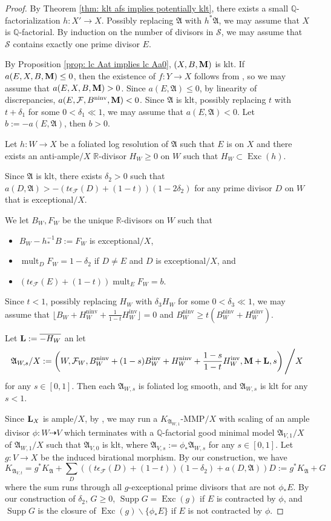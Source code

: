 \documentclass[12pt]{amsart}
\numberwithin{equation}{section}
\newcommand{\Mm}{{\bf{M}}}
\newcommand{\Rr}{\mathbb{R}}
\newcommand{\Exc}{\operatorname{Exc}}
\newcommand{\ninv}{\operatorname{ninv}}
\newcommand{\inv}{\operatorname{inv}}
\newcommand{\Supp}{\operatorname{Supp}}
\newcommand{\mult}{\operatorname{mult}}
\newcommand{\Aa}{{\mathfrak{A}}}
\newcommand{\Ff}{\mathcal{F}}
\newcommand{\Ll}{{\bf{L}}}
\theoremstyle{definition}
\theoremstyle{definition}
\theoremstyle{definition}
\begin{document}
\begin{proof}
By Theorem \ref{thm: klt afs implies potentially klt}, there exists a small $\mathbb Q$-factorialization $h: X'\rightarrow X$. Possibly replacing $\Aa$ with $h^*\Aa$, we may assume that $X$ is $\mathbb Q$-factorial. By induction on the number of divisors in $\mathcal{S}$, we may assume that $\mathcal{S}$ contains exactly one prime divisor $E$. 

By Proposition \ref{prop: lc Aat implies lc Aa0}, $(X,B,\Mm)$ is klt. If $a(E,X,B,\Mm)\leq 0$, then the existence of $f: Y\rightarrow X$ follows from \cite[Lemma 4.6]{BZ16}, so we may assume that $a(E,X,B,\Mm)>0$. Since $a(E,\Aa)\leq 0$, by linearity of discrepancies, $a(E,\Ff,B^{\ninv},\Mm)<0$. Since $\Aa$ is klt, possibly replacing $t$ with $t+\delta_1$ for some $0<\delta_1\ll 1$, we may assume that $a(E,\Aa)<0$. Let $b:=-a(E,\Aa)$, then $b>0$.

Let $h: W\rightarrow X$ be a foliated log resolution of $\Aa$ such that $E$ is on $X$ and there exists an anti-ample$/X$ $\Rr$-divisor $H_W\geq 0$ on $W$ such that $H_W\subset\Exc(h)$.

Since $\Aa$ is klt, there exists $\delta_2>0$ such that $a(D,\Aa)>-(t\epsilon_{\Ff}(D)+(1-t))(1-2\delta_2)$
for any prime divisor $D$ on $W$ that is exceptional$/X$.

We let $B_W,F_W$ be the unique $\Rr$-divisors on $W$ such that
\begin{itemize}
\item $B_W-h^{-1}_*B:=F_W$ is exceptional$/X$,
\item $\mult_DF_W=1-\delta_2$ if $D\not=E$ and $D$ is exceptional$/X$, and 
\item $(t\epsilon_{\Ff}(E)+(1-t))\mult_EF_W=b$.
\end{itemize}
Since $t<1$, possibly replacing $H_W$ with $\delta_3H_W$ for some $0<\delta_3\ll 1$, we may assume that $\lfloor B_W+H_W^{\ninv}+\frac{1}{1-t}H_W^{\inv}\rfloor=0$ and $B_W^{\ninv}\geq t(B_W^{\ninv}+H_W^{\ninv})$.

Let $\Ll:=\overline{-H_W}$ an let 
$$\Aa_{W,s}/X:=\left(W,\Ff_W,B_W^{\ninv}+(1-s)B_W^{\inv}+H_W^{\ninv}+\frac{1-s}{1-t}H_W^{\inv},\Mm+\Ll,s\right)\Bigg/X$$
for any $s\in [0,1]$. Then each $\Aa_{W,s}$ is foliated log smooth, and $\Aa_{W,s}$ is klt for any $s<1$.

Since $\Ll_X$ is ample$/X$, by \cite[Theorem 16.1.4]{CHLX23}, we may run a $K_{\Aa_{W,1}}$-MMP$/X$ with scaling of an ample divisor $\phi: W\dashrightarrow V$ which terminates with a $\mathbb Q$-factorial good minimal model $\Aa_{V,1}/X$ of $\Aa_{W,1}/X$ such that $\Aa_{V,0}$ is klt, where $\Aa_{V,s}:=\phi_*\Aa_{W,s}$ for any $s\in [0,1]$. Let $g: V\rightarrow X$ be the induced birational morphism. By our construction, we have
$$K_{\Aa_{V,t}}=g^*K_{\Aa}+\sum_D((t\epsilon_{\Ff}(D)+(1-t))(1-\delta_2)+a(D,\Aa))D:=g^*K_{\Aa}+G$$
where the sum runs through all $g$-exceptional prime divisors that are not $\phi_*E$. 
By our construction of $\delta_2$, $G\geq 0$, $\Supp G=\Exc(g)$ if $E$ is contracted by $\phi$, and $\Supp G$ is the closure of $\Exc(g)\backslash\{\phi_*E\}$ if $E$ is not contracted by $\phi$. 


\end{proof}
\end{document}
